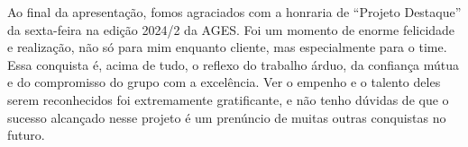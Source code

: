 Ao final da apresentação, fomos agraciados com a honraria de “Projeto Destaque” da sexta-feira na edição 2024/2 da AGES. Foi um momento de enorme felicidade e realização, não só para mim enquanto cliente, mas especialmente para o time. Essa conquista é, acima de tudo, o reflexo do trabalho árduo, da confiança mútua e do compromisso do grupo com a excelência. Ver o empenho e o talento deles serem reconhecidos foi extremamente gratificante, e não tenho dúvidas de que o sucesso alcançado nesse projeto é um prenúncio de muitas outras conquistas no futuro.\par


